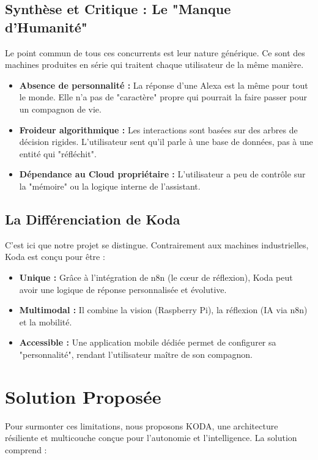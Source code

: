 \documentclass[a4paper,12pt]{report}
\newcommand{\sectiontitle}[1]{\needspace{4\baselineskip}\section{#1}}
\newcommand{\subsectiontitle}[1]{\needspace{3\baselineskip}\subsection{#1}}
\begin{document}
	\subsectiontitle{Synthèse et Critique : Le "Manque d'Humanité"}
	
	Le point commun de tous ces concurrents est leur nature générique. Ce sont des machines produites en série qui traitent chaque utilisateur de la même manière.
	
\begin{itemize}
	\item \textbf{Absence de personnalité :} La réponse d'une Alexa est la même pour tout le monde. Elle n'a pas de "caractère" propre qui pourrait la faire passer pour un compagnon de vie.
	
	\item \textbf{Froideur algorithmique :} Les interactions sont basées sur des arbres de décision rigides. L'utilisateur sent qu'il parle à une base de données, pas à une entité qui "réfléchit".
	
	\item \textbf{Dépendance au Cloud propriétaire :} L'utilisateur a peu de contrôle sur la "mémoire" ou la logique interne de l'assistant.
\end{itemize}

	\subsectiontitle{La Différenciation de Koda}
	
	C'est ici que notre projet se distingue. Contrairement aux machines industrielles, Koda est conçu pour être :
	
\begin{itemize}
	\item \textbf{Unique :} Grâce à l'intégration de n8n (le cœur de réflexion), Koda peut avoir une logique de réponse personnalisée et évolutive.
	
	\item \textbf{Multimodal :} Il combine la vision (Raspberry Pi), la réflexion (IA via n8n) et la mobilité.
	
	\item \textbf{Accessible :} Une application mobile dédiée permet de configurer sa "personnalité", rendant l'utilisateur maître de son compagnon.
\end{itemize}
	
	\sectiontitle{Solution Proposée}
	Pour surmonter ces limitations, nous proposons KODA, une architecture résiliente et multicouche conçue pour l'autonomie et l'intelligence. La solution comprend :
	
\end{document}
